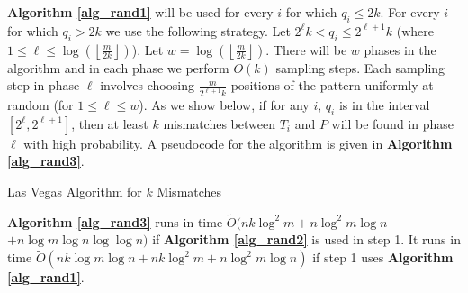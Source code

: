 \vspace{0.2in}

{\bf Algorithm \ref{alg_rand1}} will be used for every $i$ for which $q_i\leq
2k$.
For every $i$ for which $q_i>2k$ we use the following strategy. Let $2^\ell k<q_i\leq
2^{\ell+1}k$ (where $1\leq \ell\leq \log\left
(\left\lfloor\frac{m}{2k}\right\rfloor\right )$). Let $w=\log\left
(\left\lfloor\frac{m}{2k}\right\rfloor\right )$. There will be $w$ phases in
the algorithm and in each phase we perform $O(k)$ sampling steps. Each sampling
step in phase $\ell$ involves choosing $\frac{m}{2^{\ell+1} k}$ positions of
the pattern uniformly at random (for $1\leq \ell\leq w$). As we show below, if
for any $i$, $q_i$ is in the interval $[2^\ell,2^{\ell+1}]$, then at least $k$
mismatches between $T_i$ and $P$ will be found in phase $\ell$ with high
probability. A pseudocode for the algorithm is given in {\bf Algorithm
\ref{alg_rand3}}. 

{\LinesNumbered
\begin{algorithm}
\caption{Las Vegas Algorithm for $k$ Mismatches}\label{alg_rand3} 
\nonl {}
\end{algorithm}
}



\begin{theorem}
{\bf Algorithm \ref{alg_rand3}} runs in time $\widetilde O(nk\log^2m+n\log^2m\log n$
$+ n\log m\log n\log\log n)$ if {\bf Algorithm \ref{alg_rand2}} is used in step 1. It
runs in time $\widetilde O(nk\log m\log n+nk\log^2m+n\log^2m\log n)$ if step 1 uses {\bf
Algorithm \ref{alg_rand1}}.
\end{theorem}


